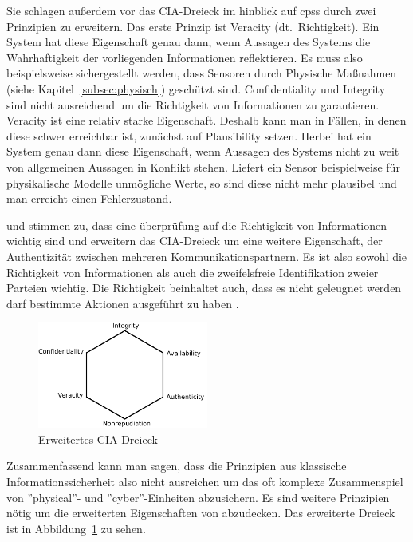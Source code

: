 \documentclass[final,bibliography=totocnumbered]{include/sikseminar}
\begin{document}
Sie schlagen außerdem vor das CIA-Dreieck im hinblick auf \glspl{cps} durch zwei Prinzipien zu erweitern.
Das erste Prinzip ist Veracity (dt.~Richtigkeit).
Ein System hat diese Eigenschaft genau dann, wenn Aussagen des Systems die Wahrhaftigkeit der vorliegenden Informationen reflektieren.
Es muss also beispielsweise sichergestellt werden, dass Sensoren durch Physische Maßnahmen (siehe Kapitel~\ref{subsec:physisch}) geschützt sind.
Confidentiality und Integrity sind nicht ausreichend um die Richtigkeit von Informationen zu garantieren.
Veracity ist eine relativ starke Eigenschaft.
Deshalb kann man in Fällen, in denen diese schwer erreichbar ist, zunächst auf Plausibility setzen.
Herbei hat ein System genau dann diese Eigenschaft, wenn Aussagen des Systems nicht zu weit von allgemeinen Aussagen in Konflikt stehen.
Liefert ein Sensor beispielweise für physikalische Modelle unmögliche Werte, so sind diese nicht mehr plausibel und man erreicht einen Fehlerzustand. \cite{GK16}

\citeauthor{WYX+10} und \citeauthor{SFJ2017} stimmen zu, dass eine überprüfung auf die Richtigkeit von Informationen wichtig sind und erweitern das CIA-Dreieck um eine weitere Eigenschaft, der Authentizität zwischen mehreren Kommunikationspartnern.
Es ist also sowohl die Richtigkeit von Informationen als auch die zweifelsfreie Identifikation zweier Parteien wichtig.
Die Richtigkeit beinhaltet auch, dass es nicht geleugnet werden darf bestimmte Aktionen ausgeführt zu haben \cite{NIST2013}.

\begin{figure}
    \centering
    \includegraphics[width=0.5\textwidth]{figure/triad}
    \caption{Erweitertes CIA-Dreieck}
    \label{fig:triad}
\end{figure}

Zusammenfassend kann man sagen, dass die Prinzipien aus klassische Informationssicherheit also nicht ausreichen um das oft komplexe Zusammenspiel von ''physical''- und ''cyber''-Einheiten abzusichern.
Es sind weitere Prinzipien nötig um die erweiterten Eigenschaften von  abzudecken.
Das erweiterte Dreieck ist in Abbildung~\ref{fig:triad} zu sehen.
\end{document}
